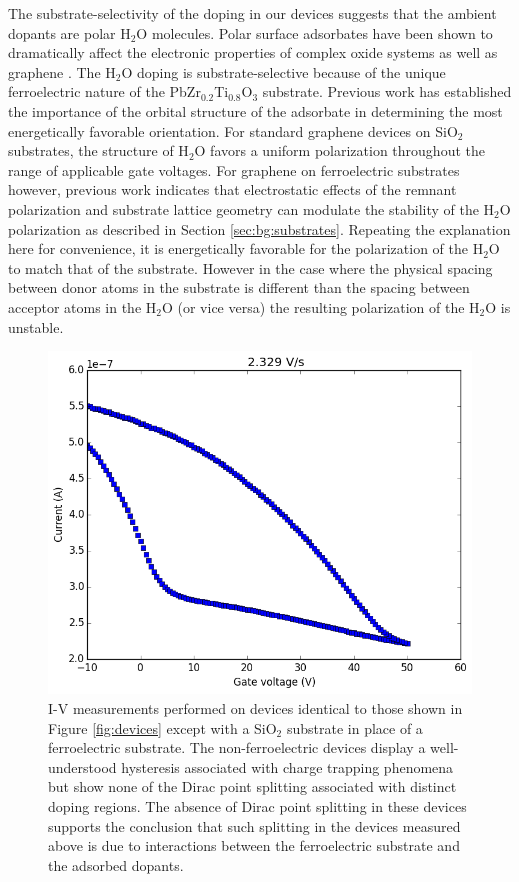\documentclass[edeposit,fullpage,draftthesis]{uiucthesis2009}
\begin{document}
        The substrate-selectivity of the doping in our devices suggests that the ambient dopants 
        are polar H$_2$O molecules. Polar surface adsorbates have been shown to dramatically 
        affect the electronic properties of complex oxide systems \cite{Xie2011} as well as graphene 
        \cite{Schedin2007, Lohmann2009,Lu2014}. The H$_2$O doping is substrate-selective because of the unique 
        ferroelectric nature of the PbZr$_{0.2}$Ti$_{0.8}$O$_3$ substrate. Previous work
        \cite{Leenaerts2007,Leenaerts2009} has established the importance of the orbital 
        structure of the adsorbate in determining the most energetically favorable orientation.
        For standard graphene devices on SiO$_2$ substrates, the structure of H$_2$O favors 
        a uniform polarization throughout the range of applicable gate voltages. For graphene 
        on ferroelectric substrates however, previous work \cite{Lu2014} indicates that electrostatic 
        effects of the remnant polarization and substrate lattice geometry can modulate the 
        stability of the H$_2$O polarization as described in Section \ref{sec:bg:substrates}. 
        Repeating the explanation here for convenience, it is energetically favorable for 
        the polarization of the H$_2$O to match
        that of the substrate. However in the case where the physical spacing between donor atoms
        in the substrate is different than the spacing between acceptor atoms in the H$_2$O (or vice
        versa) the resulting polarization of the H$_2$O is unstable.
     
        \begin{figure}
        \centering
        \includegraphics[width=0.4\linewidth]{images/resultsanddiscussion/pztpaper/Dev5_gateSweep_0007.png}
            \caption[I-V curves for graphene-SiO$_2$ devices]{
            I-V measurements performed on devices identical to those shown in Figure \ref{fig:devices}
            except with a SiO$_2$ substrate in place of a ferroelectric substrate. The non-ferroelectric
            devices display a well-understood hysteresis associated with charge trapping phenomena \cite{wang2010hysteresis}
            but show none of the Dirac point splitting associated with distinct doping regions.
            The absence of Dirac point splitting in these devices supports the conclusion that such
            splitting in the devices measured above is due to interactions between the ferroelectric
            substrate and the adsorbed dopants.
            }
        \label{fig:sio2_devices}
        \end{figure}
        
\end{document}
